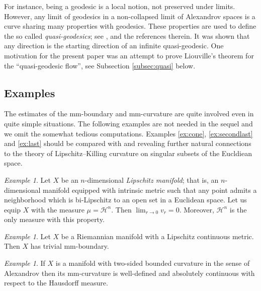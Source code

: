 \documentclass[12pt,leqno,intlimits]{amsart}
\numberwithin{equation}{section}
\theoremstyle{definition}
\theoremstyle{remark}
\newtheorem{ex}[thm]{Example}
\begin{document}
For instance,  being a geodesic is a local notion, not preserved under limits.
However, any limit of geodesics in a non-collapsed limit  of Alexandrov spaces is a curve sharing many properties with geodesics.
These properties are used to define the so called \emph{quasi-geodesics}; see \cite{PP}, \cite{Petsemi} and the references therein. 
It was shown that any direction is the starting direction of an infinite quasi-geodesic.
One motivation for the present paper was an attempt to prove Liouville's theorem for the ``quasi-geodesic flow'', see Subsection
\ref{subsec:quasi} below.

\subsection{Examples} \label{subsec:example}
The estimates of the   mm-boundary and mm-curvature are quite involved even in  quite  simple situations.
The following examples  are not  needed in the sequel and we omit the somewhat tedious computations.   Examples \ref{ex:cone}, \ref{ex:secondlast} and \ref{ex:last} should be compared with
\cite{Bernig-CAT} and \cite{Bernig-Alex} revealing further natural connections to the theory of Lipschitz--Killing curvature on singular subsets of the Eucldiean space.


\begin{ex} Let $X$ be an $n$-dimensional \emph{Lipschitz manifold}; that is, an $n$-dimensional manifold equipped with intrinsic metric such that any point admits a neighborhood which is bi-Lipschitz to an open set in a Euclidean space.
Let us equip $X$ with the measure $\mu=\mathcal H^n$.
Then $\lim _{r\to 0} v_r =0$.  Moreover, $\mathcal H^n$ is the only measure with this property.
\end{ex}












\begin{ex}
Let $X$ be a Riemannian manifold with a Lipschitz continuous metric.
Then $X$ has  trivial mm-boundary.
\end{ex}


 \begin{ex}
  If $X$ is a manifold with  two-sided bounded curvature in the sense of Alexandrov then its
  mm-curvature   is  well-defined and  absolutely continuous with respect to the Hausdorff measure.
 \end{ex}
\end{document}
